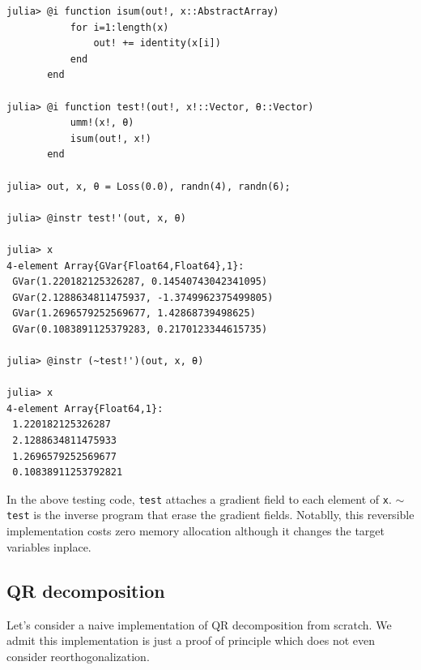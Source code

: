 \documentclass[aps,twocolumn,longbibliography,english,superscriptaddress]{revtex4-1}
\newcommand{\<}{\langle}
\renewcommand{\>}{\rangle}
\newcommand{\Tr}{{\rm Tr}}
\theoremstyle{definition}\newtheorem{definition}{\textit{Definition}}
\begin{document}
\begin{minipage}{.44\textwidth}
\begin{lstlisting}[mathescape=true]
julia> @i function isum(out!, x::AbstractArray)
           for i=1:length(x)
               out! += identity(x[i])
           end
       end

julia> @i function test!(out!, x!::Vector, θ::Vector)
           umm!(x!, θ)
           isum(out!, x!)
       end

julia> out, x, θ = Loss(0.0), randn(4), randn(6);

julia> @instr test!'(out, x, θ)

julia> x
4-element Array{GVar{Float64,Float64},1}:
 GVar(1.220182125326287, 0.14540743042341095) 
 GVar(2.1288634811475937, -1.3749962375499805)
 GVar(1.2696579252569677, 1.42868739498625)   
 GVar(0.1083891125379283, 0.2170123344615735) 

julia> @instr (~test!')(out, x, θ)

julia> x
4-element Array{Float64,1}:
 1.220182125326287  
 2.1288634811475933 
 1.2696579252569677 
 0.10838911253792821
\end{lstlisting}
\end{minipage}

In the above testing code, \texttt{test\textquotesingle} attaches a gradient field to each element of \texttt{x}. \texttt{$\sim$test\textquotesingle} is the inverse program that erase the gradient fields.
Notablly, this reversible implementation costs zero memory allocation although it changes the target variables inplace.


\subsection{QR decomposition}

Let's consider a naive implementation of QR decomposition from scratch.
We admit this implementation is just a proof of principle which does not even consider reorthogonalization.
\end{document}

